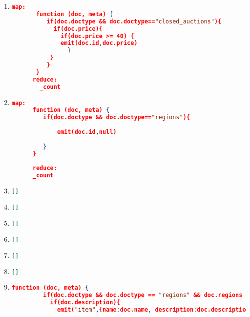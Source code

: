 \begin{enumerate}[label=Q\arabic*.]
	
    \item %
	\begin{lstlisting}[language=JSON]
	map:
	   function (doc, meta) {
	      if(doc.doctype && doc.doctype=="closed_auctions"){
	        if(doc.price){
	          if(doc.price >= 40) {
	          emit(doc.id,doc.price)
	        	}
	       }
	      }
	   }
	  reduce: 
	    _count
	\end{lstlisting}
	
    \item %
	\begin{lstlisting}[language=JSON]
	  map:
	  function (doc, meta) {
	     if(doc.doctype && doc.doctype=="regions"){
	      
	         emit(doc.id,null)
	      
	     }
	  }
	  
	  reduce: 
	  _count
	\end{lstlisting}
	
	
    \item %
	\begin{lstlisting}[language=JSON]
	   []
	\end{lstlisting}
	
	
    \item %
	\begin{lstlisting}[language=JSON]
	[]
	\end{lstlisting}
	
	
    \item %
	\begin{lstlisting}[language=JSON]
	   []
	\end{lstlisting}
	
	
    \item %
	\begin{lstlisting}[language=JSON]
	   []
	\end{lstlisting}
	
	
    \item %
	\begin{lstlisting}[language=JSON]
		[]
	\end{lstlisting}
	
	
    \item %
	\begin{lstlisting}[language=JSON]
	   []
	\end{lstlisting}
	
	
    \item %
	\begin{lstlisting}[language=JSON]
	   function (doc, meta) {
	     if(doc.doctype && doc.doctype == "regions" && doc.regions && doc.regions=="australia"){
	       if(doc.description){
	         emit("item",{name:doc.name, description:doc.description})
	       

\end{lstlisting}
\end{enumerate}
